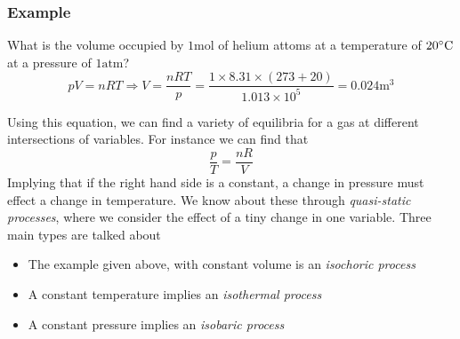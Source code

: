 \documentclass[12pt]{report}
\begin{document}
\begin{flushleft}
\subsubsection*{Example}
What is the volume occupied by \(1\mathrm{mol}\) of helium attoms at a
temperature of \(20\degree\mathrm{C}\) at a pressure of \(1\mathrm{atm}\)?
\[pV = nRT \Rightarrow V = \frac{nRT}{p} 
= \frac{1\times8.31\times(273 + 20)}{1.013\times10^5} = 0.024\mathrm{m}^3\]

\bigskip
Using this equation, we can find a variety of equilibria for a gas at different
intersections of variables. For instance we can find that
\[\frac{p}{T} = \frac{nR}{V}\]
Implying that if the right hand side is a constant, a change in pressure must
effect a change in temperature. We know about these through
\textit{quasi-static processes}, where we consider the effect of a tiny change
in one variable. Three main types are talked about

\begin{itemize}
    \item The example given above, with constant volume is an
        \textit{isochoric process}
    \item A constant temperature implies an \textit{isothermal process}
    \item A constant pressure implies an \textit{isobaric process}
\end{itemize}

\end{flushleft}
\end{document}
